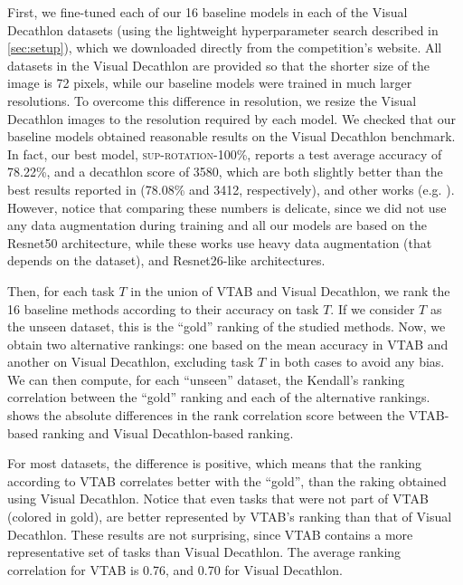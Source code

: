 \documentclass{article}
\begin{document}
First, we fine-tuned each of our 16 baseline models in each of the Visual 
Decathlon datasets (using the lightweight hyperparameter search described in \cref{sec:setup}),
which we downloaded directly from the competition's website. All datasets in the 
Visual Decathlon are provided so that the shorter size of the image is 72 pixels, 
while our baseline models were trained in much larger resolutions.
To overcome this difference in resolution, 
we resize the Visual Decathlon images to the resolution required by each model.
We checked that our baseline models obtained reasonable results on the Visual Decathlon 
benchmark. In fact, our best model,
\textsc{sup-rotation-100\%}, reports a test average accuracy of 78.22\%, and a decathlon score
of 3580, which are both slightly better than the best results reported in
\cite{rebuffi2018} (78.08\% and 3412, respectively), and other works
(e.g. \cite{rebuffi2017,rosenfeld2018incremental}). However, notice that comparing
these numbers is delicate, since we did not use any data augmentation during
training and all our models
are based on the Resnet50 architecture, while these works use heavy data augmentation
(that depends on the dataset), and Resnet26-like architectures.

Then, for each task $T$ in the union of VTAB and Visual Decathlon, we rank the 16 baseline
methods according to their accuracy on task $T$. If we consider $T$ as the unseen dataset,
this is the ``gold'' ranking of the studied methods. Now, we obtain two alternative
rankings: one based on the mean accuracy in VTAB and another on Visual Decathlon,
excluding task $T$ in both cases to avoid any bias.
We can then compute, for each ``unseen'' dataset, the Kendall's ranking correlation
between the ``gold'' ranking and each of the alternative rankings.
 shows the absolute differences in the
rank correlation score between the VTAB-based ranking and Visual Decathlon-based ranking.


For most datasets, the difference is positive, which means that the ranking according to
VTAB correlates better with the ``gold'', than the raking obtained using Visual Decathlon.
Notice that even tasks that were not part of VTAB (colored in gold), are better represented
by VTAB's ranking than that of Visual Decathlon. These results are not surprising, since VTAB
contains a more representative set of tasks than Visual Decathlon.
The average ranking correlation for VTAB is 0.76, and 0.70 for Visual Decathlon.

 
\end{document}
